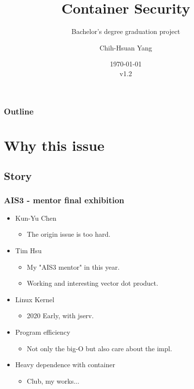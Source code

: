 \documentclass{beamer}
\title{Container Security}
\subtitle{Bachelor's degree graduation project}
\author{Chih-Hsuan Yang}
\institute{National Sun Yat-sen University}
\date{\today\\v1.2}
\begin{document}
\begin{frame}
    \titlepage
\end{frame}

\begin{frame}
    \frametitle{Outline}
    \tableofcontents
\end{frame}

\section{Why this issue}
\subsection{Story}
\begin{frame}
    \frametitle{AIS3 - mentor final exhibition}

    \begin{itemize}
        \item Kun-Yu Chen
              \begin{itemize}
                  \item The origin issue is too hard.
              \end{itemize}
        \item Tim Hsu
              \begin{itemize}
                  \item My "AIS3 mentor" in this year.
                  \item Working and interesting vector dot product.
              \end{itemize}
        \item Linux Kernel
              \begin{itemize}
                  \item 2020 Early, with jserv.
              \end{itemize}
        \item Program efficiency
              \begin{itemize}
                  \item Not only the big-O but also care about the impl.
              \end{itemize}
        \item Heavy dependence with container
              \begin{itemize}
                  \item Club, my works...
              \end{itemize}
    \end{itemize}

\end{frame}
\end{document}
